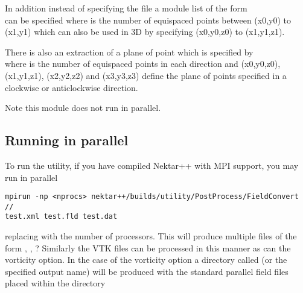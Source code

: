 In addition instead of specifying the file  a module list of the form \\  can be specified where  is the number of equispaced points between (x0,y0) to (x1,y1) which can also be used in 3D by specifying (x0,y0,z0) to (x1,y1,z1).

There is also an extraction of a plane of point which is specified by \\  where  is the number of equispaced points in each direction and (x0,y0,z0), (x1,y1,z1), (x2,y2,z2) and (x3,y3,z3) define the plane of points specified in a clockwise or anticlockwise direction.

Note this module does not run in parallel.

\subsection{Running in parallel}
To run the utility, if you have compiled Nektar++ with MPI support, you may run in parallel
\begin{lstlisting}[style=BashInputStyle]
mpirun -np <nprocs> nektar++/builds/utility/PostProcess/FieldConvert //
test.xml test.fld test.dat 
\end{lstlisting}
replacing  with the number of processors. This will produce multiple  files of the form , ,  ? Similarly the VTK files can be processed in this manner as can the vorticity option. In the case of the vorticity option a directory called  (or the specified output name) will be produced with the standard parallel field files placed within the directory
